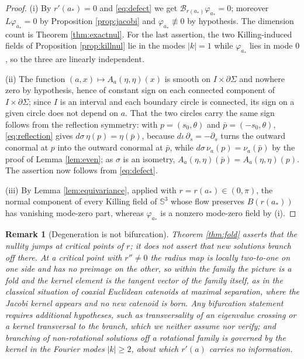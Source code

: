 \documentclass[10pt,a4paper]{amsart}
\newtheorem{remark}[theorem]{Remark}
\newcommand{\Sph}{\mathbb{S}}
\begin{document}
\begin{proof}
(i) By $r'(a_*)=0$ and \eqref{eq:defect} we get $\mathcal{B}_{r(a_*)}\varphi_{a_*}=0$; moreover $L\varphi_{a_*}=0$ by Proposition \ref{prop:jacobi} and $\varphi_{a_*}\not\equiv 0$ by hypothesis. The dimension count is Theorem \ref{thm:exactnul}. For the last assertion, the two Killing-induced fields of Proposition \ref{prop:killnul} lie in the modes $|k|=1$ while $\varphi_{a_*}$ lies in mode $0$, so the three are linearly independent.

(ii) The function $(a,x)\mapsto A_a(\eta,\eta)(x)$ is smooth on $I\times\partial\Sigma$ and nowhere zero by hypothesis, hence of constant sign on each connected component of $I\times\partial\Sigma$; since $I$ is an interval and each boundary circle is connected, its sign on a given circle does not depend on $a$. That the two circles carry the same sign follows from the reflection symmetry: with $p=(s_0,\theta)$ and $\bar p=(-s_0,\theta)$, \eqref{eq:reflection} gives $d\sigma\,\eta(p)=\eta(\bar p)$, because $d\iota\,\partial_s=-\partial_s$ turns the outward conormal at $p$ into the outward conormal at $\bar p$, while $d\sigma\,\nu_a(p)=\nu_a(\bar p)$ by the proof of Lemma \ref{lem:even}; as $\sigma$ is an isometry, $A_a(\eta,\eta)(\bar p)=A_a(\eta,\eta)(p)$. The assertion now follows from \eqref{eq:defect}.

(iii) By Lemma \ref{lem:equivariance}, applied with $r=r(a_*)\in(0,\pi)$, the normal component of every Killing field of $\Sph^3$ whose flow preserves $B(r(a_*))$ has vanishing mode-zero part, whereas $\varphi_{a_*}$ is a nonzero mode-zero field by (i).
\end{proof}

\begin{remark}[Degeneration is not bifurcation]\label{rem:nobif}
Theorem \ref{thm:fold} asserts that the nullity jumps at critical points of $r$; it does not assert that new solutions branch off there. At a critical point with $r''\neq 0$ the radius map is locally two-to-one on one side and has no preimage on the other, so within the family the picture is a fold and the kernel element is the tangent vector of the family itself, as in the classical situation of coaxial Euclidean catenoids at maximal separation, where the Jacobi kernel appears and no new catenoid is born. Any bifurcation statement requires additional hypotheses, such as transversality of an eigenvalue crossing or a kernel transversal to the branch, which we neither assume nor verify; and branching of non-rotational solutions off a rotational family is governed by the kernel in the Fourier modes $|k|\geq 2$, about which $r'(a)$ carries no information.
\end{remark}
\end{document}
